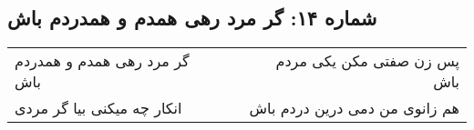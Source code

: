 \begin{center}
\section*{شماره ۱۴: گر مرد رهی همدم و همدردم باش}
\label{sec:014}
\begin{longtable}{l p{0.5cm} r}
گر مرد رهی همدم و همدردم باش
&&
پس زن صفتی مکن یکی مردم باش
\\
انکار چه میکنی بیا گر مردی
&&
هم زانوی من دمی درین دردم باش
\\
\end{longtable}
\end{center}
